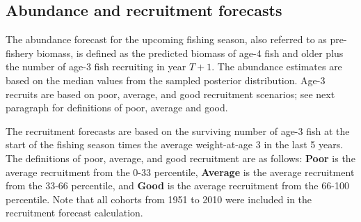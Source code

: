 	\subsection{Abundance and recruitment forecasts}
	The abundance forecast for the upcoming fishing season, also referred to as pre-fishery biomass, is defined as the predicted biomass of age-4 fish and older plus the number of age-3 fish recruiting in year $T+1$.  The abundance estimates are based on the median values from the sampled posterior distribution.  Age-3 recruits are based on poor, average, and good recruitment scenarios; see next paragraph for definitions of poor, average and good.
	
	The recruitment forecasts are based on the surviving number of age-3 fish at the start of the fishing season times the average weight-at-age 3 in the last 5 years. The definitions of poor, average, and good recruitment are as follows: \textbf{Poor} is the average recruitment from the 0-33 percentile, \textbf{Average} is the average recruitment from the 33-66 percentile, and \textbf{Good} is the average recruitment from the 66-100 percentile.  Note that all cohorts from 1951 to 2010  were included in the recruitment forecast calculation.	


\clearpage
	
